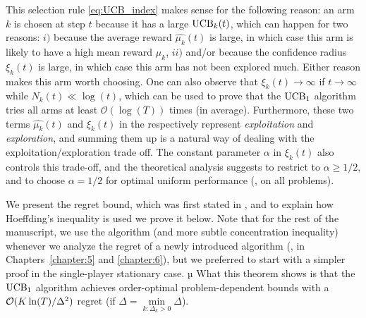 This selection rule \eqref{eq:UCB_index} makes sense for the following reason:
an arm $k$ is chosen at step $t$ because it has a large $\mathrm{UCB}_k(t)$, which can happen for two reasons:
$i)$ because the average reward $\widehat{\mu_k}(t)$ is large, in which case this arm is likely to have a high mean reward $\mu_k$,
$ii)$ and/or because the confidence radius $\xi_k(t)$ is large, in which case this arm has not been explored much.
Either reason makes this arm worth choosing.
One can also observe that $\xi_k(t)\to\infty$ if $t\to\infty$ while $N_k(t)\ll\log(t)$, which can be used to prove that the $\mathrm{UCB}_1$ algorithm tries all arms at least $\mathcal{O}(\log(T))$ times (in average).
%
Furthermore, these two terms $\widehat{\mu_k}(t)$ and $\xi_k(t)$ in the \UCB{}  respectively represent \emph{exploitation} and \emph{exploration}, and summing them up is a natural way of dealing with the exploitation/exploration trade off.
The constant parameter $\alpha$ in $\xi_k(t)$ also controls this trade-off, and the theoretical analysis suggests to restrict to $\alpha\geq1/2$, and to choose $\alpha=1/2$ for optimal uniform performance (\ie, on all problems).

We present the regret bound, which was first stated in \cite{Auer02}, and to explain how Hoeffding's inequality is used we prove it below.
Note that for the rest of the manuscript, we use the \klUCB{} algorithm (and more subtle concentration inequality) whenever we analyze the regret of a newly introduced algorithm (\ie, in Chapters~\ref{chapter:5} and \ref{chapter:6}),
but we preferred to start with a simpler proof in the single-player stationary case.
µ
What this theorem shows is that the $\mathrm{UCB}_1$ algorithm achieves order-optimal problem-dependent bounds with a $\mathcal{O}(K\ln(T)/\Delta^2)$ regret (if $\Delta=\min\limits_{k: \Delta_k>0} \Delta$).

